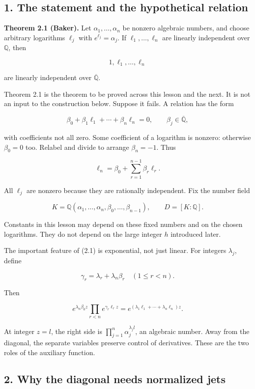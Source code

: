 \documentclass[
  11pt,
  a4paper,
]{article}
\begin{document}
\subsection{1. The statement and the hypothetical
relation}\label{the-statement-and-the-hypothetical-relation}

\textbf{Theorem 2.1 (Baker).} Let \(\alpha_1,\ldots,\alpha_n\) be
nonzero algebraic numbers, and choose arbitrary logarithms \(\ell_j\)
with \(e^{\ell_j}=\alpha_j\). If \(\ell_1,\ldots,\ell_n\) are linearly
independent over \(\mathbb Q\), then

\[
1,\ell_1,\ldots,\ell_n
\]

are linearly independent over \(\overline{\mathbb Q}\).

Theorem 2.1 is the theorem to be proved across this lesson and the next.
It is not an input to the construction below. Suppose it fails. A
relation has the form

\[
\beta_0+\beta_1\ell_1+\cdots+\beta_n\ell_n=0,
\qquad \beta_j\in\overline{\mathbb Q},
\]

with coefficients not all zero. Some coefficient of a logarithm is
nonzero: otherwise \(\beta_0=0\) too. Relabel and divide to arrange
\(\beta_n=-1\). Thus

\[
\ell_n=\beta_0+\sum_{r=1}^{n-1}\beta_r\ell_r. \tag{2.1}
\]

All \(\ell_j\) are nonzero because they are rationally independent. Fix
the number field

\[
K=\mathbb Q(\alpha_1,\ldots,\alpha_n,\beta_0,\ldots,\beta_{n-1}),
\qquad D=[K:\mathbb Q].
\]

Constants in this lesson may depend on these fixed numbers and on the
chosen logarithms. They do not depend on the large integer \(h\)
introduced later.

The important feature of (2.1) is exponential, not just linear. For
integers \(\lambda_j\), define

\[
\gamma_r=\lambda_r+\lambda_n\beta_r\quad(1\le r<n).
\]

Then

\[
e^{\lambda_n\beta_0 z}\prod_{r<n}e^{\gamma_r\ell_r z}
=e^{(\lambda_1\ell_1+\cdots+\lambda_n\ell_n)z}.
\]

At integer \(z=l\), the right side is
\(\prod_{j=1}^n\alpha_j^{\lambda_j l}\), an algebraic number. Away from
the diagonal, the separate variables preserve control of derivatives.
These are the two roles of the auxiliary function.

\subsection{2. Why the diagonal needs normalized
jets}\label{why-the-diagonal-needs-normalized-jets}
\end{document}
